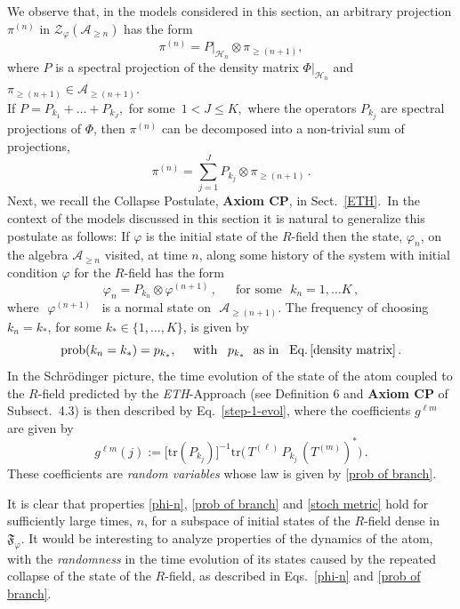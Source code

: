\documentclass[12pt]{article}
\begin{document}
{We observe that, in the models considered in this section, an arbitrary projection $\pi^{(n)}$ in 
$\mathcal{Z}_{\varphi}(\mathcal{A}_{\geq n})$ has the form
$$\pi^{(n)} = P\vert_{\mathcal{H}_n} \otimes \pi_{\geq(n+1)},$$
where $P$ is a spectral projection of the density matrix $\Phi\vert_{\mathcal{H}_n}$ and $\pi_{\geq (n+1)} \in \mathcal{A}_{\geq(n+1)}$.\\ 
If $P= P_{k_1}+\dots + P_{k_J},$ for some \,$1< J\leq K,$ where the operators $P_{k_j}$ are spectral projections of 
$\Phi$, then $\pi^{(n)}$ can be decomposed into a non-trivial sum of projections,
$$\pi^{(n)}= \sum_{j=1}^{J} P_{k_j}\otimes \pi_{\geq(n+1)}\,.$$
Next, we recall the Collapse Postulate, {\bf{Axiom CP}}, in Sect.~\ref{ETH}.~In the context of the models discussed 
in this section it is natural to generalize this postulate as follows: 
If $\varphi$ is the initial state of the $R$-field then the state, $\varphi_n$, on the algebra $\mathcal{A}_{\geq n}$ visited, 
at time $n$, along some history of the system with initial condition $\varphi$ for the $R$-field has the form
\begin{equation}\label{phi-n}
\varphi_{n} = P_{k_n} \otimes \varphi^{(n+1)}\,, \quad \, \text{ for some   }\,\, k_n = 1,\dots K\,,
\end{equation}
where\,\, $\varphi^{(n+1)} $\,\,\ is a normal state on\,\, $\mathcal{A}_{\geq(n+1)}$. The frequency of choosing $k_n=k_{*}$,
for some $k_{*}\in \{1,\dots, K\}$, is given by
\begin{equation}\label{prob of branch}
\text{prob}(k_n=k_{*}) = p_{k_{*}}, \quad \text{ with  }\,\, \,p_{k_{*}} \,\, \text{ as in }\,\, \, \text{Eq.}\,\eqref{density matrix}\,.
\end{equation}
In the Schr\"odinger picture, the time evolution of the state of the atom coupled to the $R$-field predicted by the 
\textit{ETH}-Approach (see Definition 6 and {\bf{Axiom CP}} of Subsect.~4.3) is then described by Eq.~\eqref{step-1-evol}, 
where the coefficients $g^{\ell m}$ are given by
\begin{equation}\label{stoch metric}
g^{\ell m}(j):= \big[\text{tr}(P_{k_j})\big]^{-1} \text{tr}\big(\, T^{(\ell)}\,P_{k_j}\, (T^{(m)})^{*} \big)\,.
\end{equation}
These coefficients are \textit{random variables} whose law is given by \eqref{prob of branch}.

It is clear that properties \eqref{phi-n}, \eqref{prob of branch} and \eqref{stoch metric} hold for sufficiently large times, $n$, for a subspace of initial states of the $R$-field dense in $\mathfrak{F}_{\varphi}$.
It would be interesting to analyze properties of the dynamics of the atom, with the \textit{randomness} in the time evolution of its states caused by the repeated collapse of the state of the $R$-field, as described in Eqs.~\eqref{phi-n} and 
\eqref{prob of branch}.

}
\end{document}
